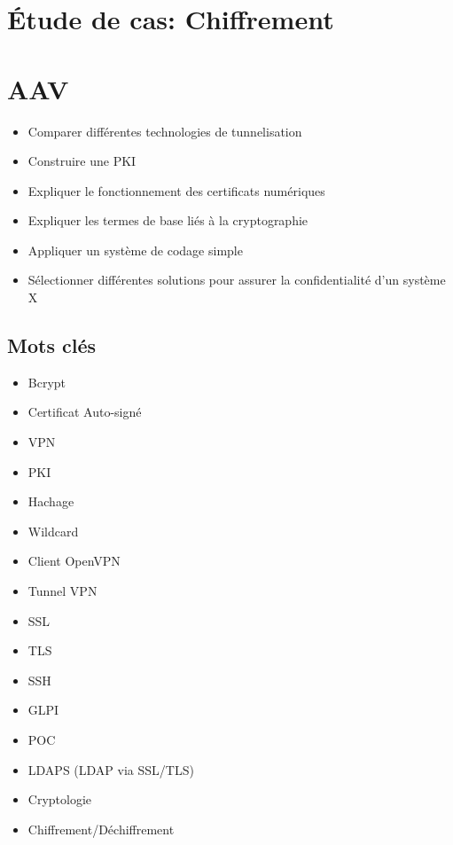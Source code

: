 \section*{Étude de cas: Chiffrement}

\section*{AAV}
\begin{itemize}
  \item [4] Comparer différentes technologies de tunnelisation
  \item [4] Construire une PKI
  \item [2] Expliquer le fonctionnement des certificats numériques
  \item [2] Expliquer les termes de base liés à la cryptographie
  \item [3] Appliquer un système de codage simple
  \item [4] Sélectionner différentes solutions pour assurer la confidentialité d'un système X
\end{itemize}

\subsection*{Mots clés}
{}
\begin{itemize}
  \item Bcrypt
  \item Certificat Auto-signé
  \item VPN
  \item PKI
  \item Hachage
  \item Wildcard
  \item Client OpenVPN
  \item Tunnel VPN
  \item SSL
  \item TLS
  \item SSH
  \item GLPI
  \item POC
  \item LDAPS (LDAP via SSL/TLS)
  \item Cryptologie
  \item Chiffrement/Déchiffrement 
\end{itemize}

